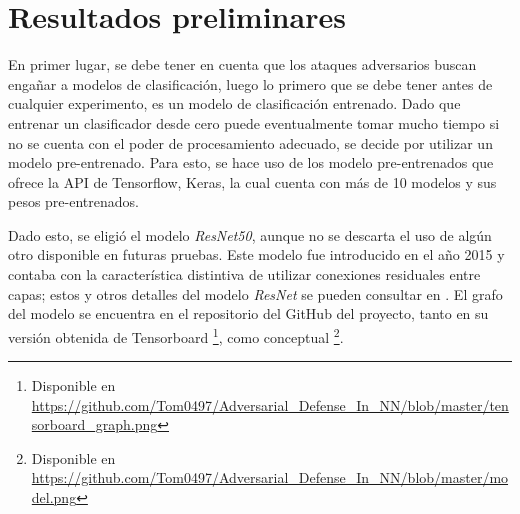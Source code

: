 \documentclass[conference]{IEEEtran}
\begin{document}
\section{Resultados preliminares}

En primer lugar, se debe tener en cuenta que los ataques adversarios buscan engañar a modelos de clasificación, luego lo primero que se debe tener antes de cualquier experimento, es un modelo de clasificación entrenado. Dado que entrenar un clasificador desde cero puede eventualmente tomar mucho tiempo si no se cuenta con el poder de procesamiento adecuado, se decide por utilizar un modelo pre-entrenado. Para esto, se hace uso de los modelo pre-entrenados que ofrece la API de Tensorflow, Keras, la cual cuenta con más de 10 modelos y sus pesos pre-entrenados.

Dado esto, se eligió el modelo \textit{ResNet50}, aunque no se descarta el uso de algún otro disponible en futuras pruebas. Este modelo fue introducido en el año 2015 y contaba con la característica distintiva de utilizar conexiones residuales entre capas; estos y otros detalles del modelo \textit{ResNet} se pueden consultar en \cite{resnet}. El grafo del modelo se encuentra en el repositorio del GitHub del proyecto, tanto en su versión obtenida de Tensorboard \footnote{Disponible en \url{https://github.com/Tom0497/Adversarial_Defense_In_NN/blob/master/tensorboard_graph.png}}, como conceptual \footnote{Disponible en \url{https://github.com/Tom0497/Adversarial_Defense_In_NN/blob/master/model.png}}.
\end{document}
